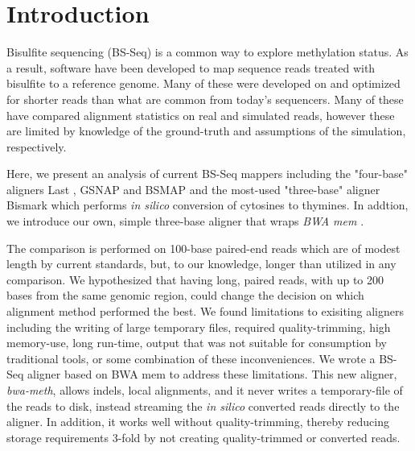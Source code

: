 \documentclass{bioinfo}
\begin{document}
\section{Introduction}
Bisulfite sequencing (BS-Seq) is a common way to explore methylation status.
As a result, software \citep{frithlast,methylcoder,gsnap,krueger2011,bsmap}
have been developed to map sequence reads treated with bisulfite to a reference genome.
Many of these were developed on and optimized for shorter reads
than what are common from today's sequencers. Many of these have compared alignment
statistics on real \citep{methylcoder,bsmap} and simulated \citep{frithlast} reads,
however these are limited by knowledge of the ground-truth and assumptions of
the simulation, respectively.

Here, we present an analysis of current BS-Seq mappers including the "four-base" aligners
Last \citep{frithlast}, GSNAP \citep{gsnap} and BSMAP \citep{bsmap} and the most-used
"three-base" aligner Bismark \citep{krueger2011} which performs \emph{in silico} conversion
of cytosines to thymines. In addtion, we introduce our
own, simple three-base aligner that wraps \textit{BWA mem} \citep{bwamem}.

The comparison is performed on 100-base paired-end reads
which are of modest length by current standards, but, to our knowledge, longer than
utilized in any comparison. We hypothesized that having long, paired reads, with up
to 200 bases from the same genomic region, could change the decision on which
alignment method performed the best. 
We found limitations to exisiting aligners including the writing of large temporary
files, required quality-trimming, high memory-use, long run-time, output that was not
suitable for consumption by traditional tools, or some combination of these
inconveniences. We wrote
a BS-Seq aligner based on BWA mem \citep{bwamem} to address these
limitations. This new aligner, 
\textit{bwa-meth}, allows indels, local alignments, and it never writes a
temporary-file of the reads to disk, instead streaming the \emph{in silico} converted
reads directly to the aligner. In addition, it works well without quality-trimming,
thereby reducing storage requirements 3-fold by not creating quality-trimmed or
converted reads.
\end{document}
